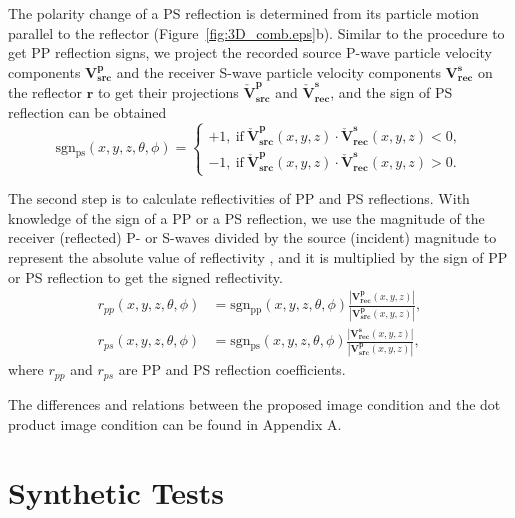 \documentclass[manuscript,ulem,graphix,revised]{geophysics}
\begin{document}
The polarity change of a PS reflection is determined from its particle motion parallel to the reflector (Figure~\ref{fig:3D_comb.eps}b). Similar to the procedure to get PP reflection signs, we project the recorded source P-wave particle velocity components $\mathbf{V}^{\mathbf{p}}_{\mathbf{src}}$ and the receiver S-wave particle velocity components $\mathbf{V}^{\mathbf{s}}_{\mathbf{rec}}$ on the reflector $\mathbf{r}$ to get their projections $\check{\mathbf{V}}^{\mathbf{p}}_{\mathbf{src}}$ and $\check{\mathbf{V}}^{\mathbf{s}}_{\mathbf{rec}}$, and the sign of PS reflection can be obtained
\begin{equation}
\mathrm{sgn_{ps}}(x,y,z,\theta,\phi)=\begin{cases}
 +1, \ \mathrm{if} \ \check{\mathbf{V}}^{\mathbf{p}}_{\mathbf{src}}(x,y,z) \cdot \check{\mathbf{V}}^{\mathbf{s}}_{\mathbf{rec}}(x,y,z)<0, \\ 
 -1, \ \mathrm{if}  \ \check{\mathbf{V}}^{\mathbf{p}}_{\mathbf{src}}(x,y,z) \cdot \check{\mathbf{V}}^{\mathbf{s}}_{\mathbf{rec}}(x,y,z)>0 .
\end{cases}
\label{eqn:sgn_ps}
\end{equation}

The second step is to calculate reflectivities of PP and PS reflections. With knowledge of the sign of a PP or a PS reflection, we use the magnitude of the receiver (reflected) P- or S-waves divided by the source (incident) magnitude to represent the absolute value of reflectivity \citep{sheriff95}, and it is multiplied by the sign of PP or PS reflection to get the signed reflectivity.
\begin{equation}
\begin{aligned}
r_{pp}(x,y,z,\theta,\phi)&=\mathrm{sgn_{pp}}(x,y,z,\theta,\phi)\frac{|\mathbf{V^p_{rec}}(x,y,z)|}{|\mathbf{V^p_{src}}(x,y,z)|},\\
r_{ps}(x,y,z,\theta,\phi)&=\mathrm{sgn_{ps}}(x,y,z,\theta,\phi)\frac{|\mathbf{V^s_{rec}}(x,y,z)|}{|\mathbf{V^p_{src}}(x,y,z)|},
\end{aligned}
\label{eqn:reflectivity}
\end{equation}
where $r_{pp}$ and $r_{ps}$ are PP and PS reflection coefficients.%

The differences and relations between the proposed image condition and the dot product image condition \citep{wang_cl16} can be found in Appendix A.



\section{Synthetic Tests}
\end{document}
